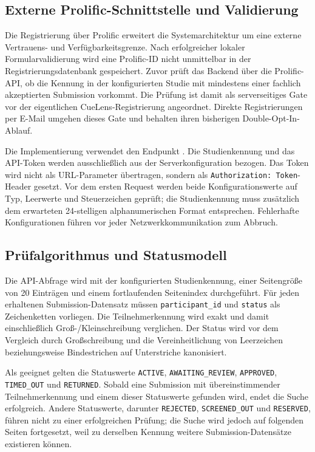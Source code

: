 
\begin{neu}
\section{Externe Prolific-Schnittstelle und Validierung}

Die Registrierung über Prolific erweitert die Systemarchitektur um eine externe Vertrauens- und Verfügbarkeitsgrenze. Nach erfolgreicher lokaler Formularvalidierung wird eine Prolific-ID nicht unmittelbar in der Registrierungsdatenbank gespeichert. Zuvor prüft das Backend über die Prolific-API, ob die Kennung in der konfigurierten Studie mit mindestens einer fachlich akzeptierten Submission vorkommt. Die Prüfung ist damit als serverseitiges Gate vor der eigentlichen CueLens-Registrierung angeordnet. Direkte Registrierungen per E-Mail umgehen dieses Gate und behalten ihren bisherigen Double-Opt-In-Ablauf.

Die Implementierung verwendet den Endpunkt . Die Studienkennung und das API-Token werden ausschließlich aus der Serverkonfiguration bezogen. Das Token wird nicht als URL-Parameter übertragen, sondern als \texttt{Authorization: Token}-Header gesetzt. Vor dem ersten Request werden beide Konfigurationswerte auf Typ, Leerwerte und Steuerzeichen geprüft; die Studienkennung muss zusätzlich dem erwarteten 24-stelligen alphanumerischen Format entsprechen. Fehlerhafte Konfigurationen führen vor jeder Netzwerkkommunikation zum Abbruch.

\subsection{Prüfalgorithmus und Statusmodell}

Die API-Abfrage wird mit der konfigurierten Studienkennung, einer Seitengröße von 20 Einträgen und einem fortlaufenden Seitenindex durchgeführt. Für jeden erhaltenen Submission-Datensatz müssen \texttt{participant\_id} und \texttt{status} als Zeichenketten vorliegen. Die Teilnehmerkennung wird exakt und damit einschließlich Groß-/Kleinschreibung verglichen. Der Status wird vor dem Vergleich durch Großschreibung und die Vereinheitlichung von Leerzeichen beziehungsweise Bindestrichen auf Unterstriche kanonisiert.

Als geeignet gelten die Statuswerte \texttt{ACTIVE}, \texttt{AWAITING\_REVIEW}, \texttt{APPROVED}, \texttt{TIMED\_OUT} und \texttt{RETURNED}. Sobald eine Submission mit übereinstimmender Teilnehmerkennung und einem dieser Statuswerte gefunden wird, endet die Suche erfolgreich. Andere Statuswerte, darunter \texttt{REJECTED}, \texttt{SCREENED\_OUT} und \texttt{RESERVED}, führen nicht zu einer erfolgreichen Prüfung; die Suche wird jedoch auf folgenden Seiten fortgesetzt, weil zu derselben Kennung weitere Submission-Datensätze existieren können.


\end{neu}
